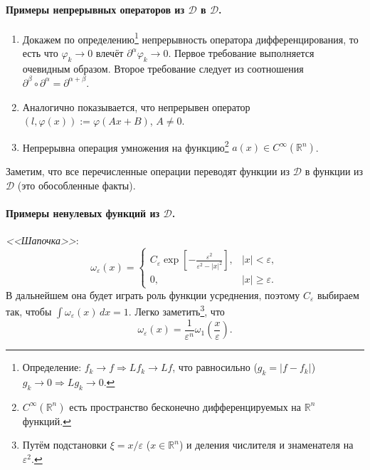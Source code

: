\paragraph{Примеры непрерывных операторов из $ \mathcal D $ в $ \mathcal D $.} 
\begin{enumerate}
  \item Докажем по определению\footnote{Определение: $ f_k \to f
      \Rightarrow Lf_k \to Lf $, что равносильно ($ g_k = |f - f_k| $) $ g_k \to 0
    \Rightarrow Lg_k \to 0 $.} непрерывность оператора дифференцирования, то есть
    что $ \varphi_k \to 0 $ влечёт $
    \partial^\alpha\varphi_k \to 0 $. Первое требование выполняется очевидным
    образом. Второе требование следует из соотношения $ \partial^\beta \circ
    \partial^\alpha = \partial^{\alpha + \beta} $.
  \item Аналогично показывается, что непрерывен оператор $ (l, \varphi(x)) :=
    \varphi(Ax + B) $, $ A \neq 0 $.
  \item  Непрерывна операция умножения на функцию\footnote{$C^\infty(\mathbb
      R^n)$ есть
    пространство бесконечно дифференцируемых на $ \mathbb R^n $ функций.} $
  a(x)\in C^\infty(\mathbb R^n) $.
\end{enumerate}
Заметим, что все перечисленные операции переводят функции из $ \mathcal D $ в
функции из $ \mathcal D $ (это обособленные факты).

\paragraph{Примеры ненулевых функций из $ \mathcal D $.}
\emph{<<Шапочка>>}: 
\[
  \omega_\varepsilon(x) = \begin{cases}
    C_\varepsilon\exp \left[ - \frac{\varepsilon^2}{\varepsilon^2 - |x|^2}
    \right], & |x| < \varepsilon,\\
    0, & |x| \geqslant \varepsilon.
  \end{cases}
\]
В дальнейшем она будет играть роль функции усреднения, поэтому $ C_\varepsilon $
выбираем так, чтобы $ \int \omega_\varepsilon(x)\,dx=1 $. Легко
заметить\footnote{Путём подстановки $ \xi = x/\varepsilon $ ($ x \in \mathbb R^n
  $) и деления числителя
и знаменателя на $ \varepsilon^2 $.}, что 
\[
    \omega_\varepsilon(x) = \frac{1}{\varepsilon^n}\omega_1 \left(
    \frac{x}{\varepsilon} \right).
\]


